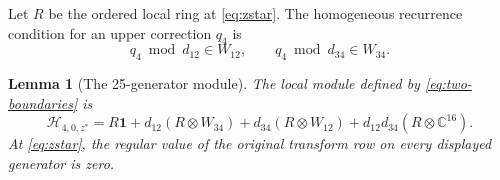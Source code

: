 \documentclass[11pt,reqno]{amsart}
\newtheorem{lemma}[theorem]{Lemma}
\theoremstyle{definition}
\theoremstyle{remark}
\newcommand{\C}{\mathbb C}
\newcommand{\one}{\mathbf 1}
\begin{document}
Let $R$ be the ordered local ring at \eqref{eq:zstar}.  The homogeneous
recurrence condition for an upper correction $q_4$ is
\begin{equation}
 q_4\bmod d_{12}\in W_{12},
 \qquad
 q_4\bmod d_{34}\in W_{34}.
 \label{eq:two-boundaries}
\end{equation}

\begin{lemma}[The 25-generator module]
\label{lem:25module}
The local module defined by \eqref{eq:two-boundaries} is
\begin{equation}
 \mathscr H_{4,0,z^*}
 =R\one+d_{12}(R\otimes W_{34})
 +d_{34}(R\otimes W_{12})
 +d_{12}d_{34}(R\otimes\C^{16}).
 \label{eq:25module}
\end{equation}
At \eqref{eq:zstar}, the regular value of the original transform row on every
displayed generator is zero.
\end{lemma}
\end{document}
